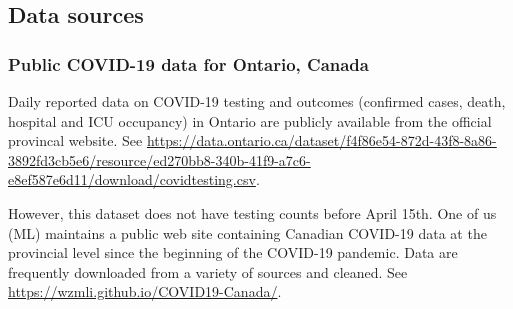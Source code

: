 \documentclass[12pt]{article}\usepackage[]{graphicx}\usepackage[]{color}
\begin{document}
\subsection{Data sources}

% 
% 

\subsubsection*{Public COVID-19 data for Ontario, Canada}


Daily reported data on COVID-19 testing and outcomes (confirmed cases, death, hospital and ICU occupancy) in Ontario are publicly available from the official provincal website. See
\url{https://data.ontario.ca/dataset/f4f86e54-872d-43f8-8a86-3892fd3cb5e6/resource/ed270bb8-340b-41f9-a7c6-e8ef587e6d11/download/covidtesting.csv}.

However, this dataset does not have testing counts before April 15th. 
One of us (ML) maintains a public web site containing Canadian COVID-19 data at the provincial level since the beginning of the COVID-19 pandemic.   
Data are frequently downloaded from a variety of sources and cleaned.  See
\url{https://wzmli.github.io/COVID19-Canada/}.

\end{document}
